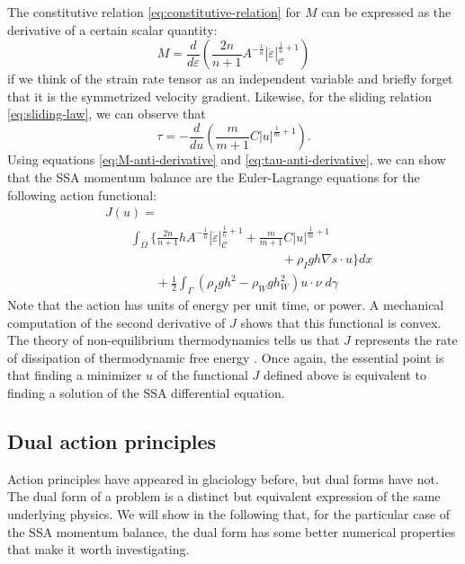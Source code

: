 \documentclass[review,oneside]{igs}
\begin{document}
The constitutive relation \eqref{eq:constitutive-relation} for $M$ can be expressed as the derivative of a certain scalar quantity:
\begin{equation}
    M = \frac{d}{d\dot\varepsilon}\left(\frac{2n}{n + 1}A^{-\frac{1}{n}}|\dot\varepsilon|_{\mathscr C}^{\frac{1}{n} + 1}\right)
    \label{eq:M-anti-derivative}
\end{equation}
if we think of the strain rate tensor as an independent variable and briefly forget that it is the symmetrized velocity gradient.
Likewise, for the sliding relation \eqref{eq:sliding-law}, we can observe that
\begin{equation}
    \tau = -\frac{d}{du}\left(\frac{m}{m + 1}C|u|^{\frac{1}{m} + 1}\right).
    \label{eq:tau-anti-derivative}
\end{equation}
Using equations \eqref{eq:M-anti-derivative} and \eqref{eq:tau-anti-derivative}, we can show that the SSA momentum balance are the Euler-Lagrange equations for the following action functional:
\begin{align}
    & J(u) = \nonumber\\
    & \qquad\int_\Omega\Bigg\{\frac{2n}{n + 1}hA^{-\frac{1}{n}}|\dot\varepsilon|_{\mathscr{C}}^{\frac{1}{n} + 1} + \frac{m}{m + 1}C|u|^{\frac{1}{m} + 1} \nonumber\\
    & \qquad\qquad\qquad\qquad\qquad\qquad\qquad + \rho_I gh\nabla s\cdot u\Bigg\}dx  \nonumber \\
    & \qquad\qquad + \frac{1}{2}\int_\Gamma\left(\rho_Igh^2 - \rho_Wgh_W^2\right)u\cdot\nu\; d\gamma
    \label{eq:ssa-primal-action}
\end{align}
Note that the action has units of energy per unit time, or power.
A mechanical computation of the second derivative of $J$ shows that this functional is convex.
The theory of non-equilibrium thermodynamics tells us that $J$ represents the rate of dissipation of thermodynamic free energy \citep{edelen1972nonlinear}.
Once again, the essential point is that finding a minimizer $u$ of the functional $J$ defined above is equivalent to finding a solution of the SSA differential equation.


\subsection{Dual action principles}
\label{subsec:dual-action-principles}

Action principles have appeared in glaciology before, but dual forms have not.
The dual form of a problem is a distinct but equivalent expression of the same underlying physics.
We will show in the following that, for the particular case of the SSA momentum balance, the dual form has some better numerical properties that make it worth investigating.
\end{document}
